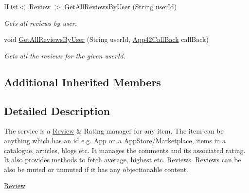 \begin{DoxyCompactItemize}
I\+List$<$ \hyperlink{classcom_1_1shephertz_1_1app42_1_1paas_1_1sdk_1_1csharp_1_1review_1_1_review}{Review} $>$ \hyperlink{classcom_1_1shephertz_1_1app42_1_1paas_1_1sdk_1_1csharp_1_1review_1_1_review_service_a5f6576945aabbdb03008a0d2fd1674f8}{Get\+All\+Reviews\+By\+User} (String user\+Id)
\begin{DoxyCompactList}\small\item\em Gets all reviews by user. \end{DoxyCompactList}\item 
void \hyperlink{classcom_1_1shephertz_1_1app42_1_1paas_1_1sdk_1_1csharp_1_1review_1_1_review_service_ad165df7792fe2592f2aff301d437a80b}{Get\+All\+Reviews\+By\+User} (String user\+Id, \hyperlink{interfacecom_1_1shephertz_1_1app42_1_1paas_1_1sdk_1_1csharp_1_1_app42_call_back}{App42\+Call\+Back} call\+Back)
\begin{DoxyCompactList}\small\item\em Gets all the reviews for the given user\+Id. \end{DoxyCompactList}\end{DoxyCompactItemize}
\subsection*{Additional Inherited Members}


\subsection{Detailed Description}
The service is a \hyperlink{classcom_1_1shephertz_1_1app42_1_1paas_1_1sdk_1_1csharp_1_1review_1_1_review}{Review} \& Rating manager for any item. The item can be anything which has an id e.\+g. App on a App\+Store/\+Marketplace, items in a catalogue, articles, blogs etc. It manages the comments and its associated rating. It also provides methods to fetch average, highest etc. Reviews. Reviews can be also be muted or unmuted if it has any objectionable content. 

\hyperlink{classcom_1_1shephertz_1_1app42_1_1paas_1_1sdk_1_1csharp_1_1review_1_1_review_service}{Review} 

